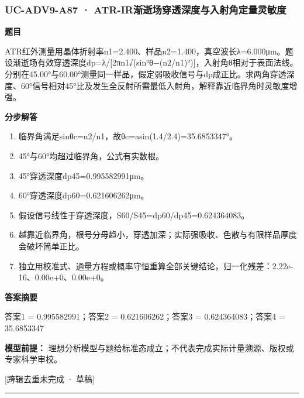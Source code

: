 \documentclass[UTF8,11pt,a4paper]{ctexart}
\begin{document}
\subsubsection*{UC-ADV9-A87 · ATR-IR渐逝场穿透深度与入射角定量灵敏度}
\noindent\textbf{题目}\par
ATR红外测量用晶体折射率n1=2.400、样品n2=1.400，真空波长λ=6.000μm。题设渐逝场有效穿透深度dp=λ/[2πn1√(sin²θ−(n2/n1)²)]，入射角θ相对于表面法线。分别在45.00°与60.00°测量同一样品，假定弱吸收信号与dp成正比。求两角穿透深度、60°信号相对45°比及发生全反射所需最低入射角，解释靠近临界角时灵敏度增强。\par
\medskip\noindent\textbf{分步解答}
\begin{enumerate}
\item 临界角满足sinθc=n2/n1，故θc=asin(1.4/2.4)=35.6853347°。
\item 45°与60°均超过临界角，公式有实数根。
\item 45°穿透深度dp45=0.995582991μm。
\item 60°穿透深度dp60=0.621606262μm。
\item 假设信号线性于穿透深度，S60/S45=dp60/dp45=0.624364083。
\item 越靠近临界角，根号分母趋小，穿透加深；实际强吸收、色散与有限样品厚度会破坏简单正比。
\item 独立用校准式、通量方程或概率守恒重算全部关键结论，归一化残差：2.22e-16、0.00e+0、0.00e+0。
\end{enumerate}
\noindent\textbf{答案摘要}\par
答案1 = 0.995582991；答案2 = 0.621606262；答案3 = 0.624364083；答案4 = 35.6853347\par
\noindent\textbf{模型前提：}
理想分析模型与题给标准态成立；不代表完成实际计量溯源、版权或专家科学审校。\par
\noindent\textcolor{red!65!black}{[跨辑去重未完成 · 草稿]} \par
\medskip\hrule\medskip
{}
\end{document}
